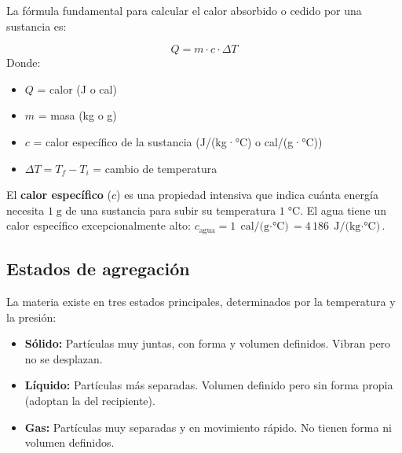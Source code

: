 \documentclass[12pt, a4paper]{article}
\begin{document}
La fórmula fundamental para calcular el calor absorbido o cedido por una sustancia es:

\begin{cuadroteoria}
$$Q = m \cdot c \cdot \Delta T$$
Donde:
\begin{itemize}[leftmargin=*]
  \item $Q$ = calor (J o cal)
  \item $m$ = masa (kg o g)
  \item $c$ = calor específico de la sustancia (J/(kg·°C) o cal/(g·°C))
  \item $\Delta T = T_f - T_i$ = cambio de temperatura
\end{itemize}
\end{cuadroteoria}

El \textbf{calor específico} ($c$) es una propiedad intensiva que indica cuánta energía necesita $1\;\text{g}$ de una sustancia para subir su temperatura $1\;°\text{C}$. El agua tiene un calor específico excepcionalmente alto: $c_{\text{agua}} = 1\;\text{cal/(g$\cdot$°C)} = 4\,186\;\text{J/(kg$\cdot$°C)}$.

\subsection{Estados de agregación}

La materia existe en tres estados principales, determinados por la temperatura y la presión:

\begin{cuadrosolucion}
\begin{itemize}[leftmargin=*]
  \item \textbf{Sólido:} Partículas muy juntas, con forma y volumen definidos. Vibran pero no se desplazan.
  \item \textbf{Líquido:} Partículas más separadas. Volumen definido pero sin forma propia (adoptan la del recipiente).
  \item \textbf{Gas:} Partículas muy separadas y en movimiento rápido. No tienen forma ni volumen definidos.
\end{itemize}
\end{cuadrosolucion}
\end{document}
